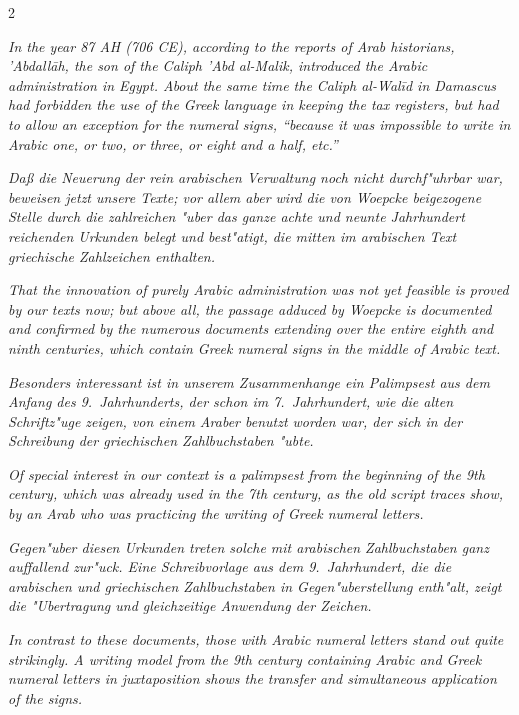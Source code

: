 \documentclass[10pt,a4paper]{article}
\newcommand{\enquote}[1]{``#1''}
\begin{document}
\begin{paracol}{2}
\switchcolumn

\textit{In the year 87 AH (706 CE), according to the reports of Arab historians, 'Abdall\=ah, the son of the Caliph 'Abd al-Malik, introduced the Arabic administration in Egypt. About the same time the Caliph al-Wal\={i}d in Damascus had forbidden the use of the Greek language in keeping the tax registers, but had to allow an exception for the numeral signs, \enquote{because it was impossible to write in Arabic one, or two, or three, or eight and a half, etc.}}

\switchcolumn*

\textit{Da\ss{} die Neuerung der rein arabischen Verwaltung noch nicht durchf"uhrbar war, beweisen jetzt unsere Texte; vor allem aber wird die von Woepcke beigezogene Stelle durch die zahlreichen "uber das ganze achte und neunte Jahrhundert reichenden Urkunden belegt und best"atigt, die mitten im arabischen Text griechische Zahlzeichen enthalten.}

\switchcolumn

\textit{That the innovation of purely Arabic administration was not yet feasible is proved by our texts now; but above all, the passage adduced by Woepcke is documented and confirmed by the numerous documents extending over the entire eighth and ninth centuries, which contain Greek numeral signs in the middle of Arabic text.}

\switchcolumn*

\textit{Besonders interessant ist in unserem Zusammenhange ein Palimpsest aus dem Anfang des 9.\ Jahrhunderts, der schon im 7.\ Jahrhundert, wie die alten Schriftz"uge zeigen, von einem Araber benutzt worden war, der sich in der Schreibung der griechischen Zahlbuchstaben "ubte.}

\switchcolumn

\textit{Of special interest in our context is a palimpsest from the beginning of the 9th century, which was already used in the 7th century, as the old script traces show, by an Arab who was practicing the writing of Greek numeral letters.}

\switchcolumn*

\textit{Gegen"uber diesen Urkunden treten solche mit arabischen Zahlbuchstaben ganz auffallend zur"uck. Eine Schreibvorlage aus dem 9.\ Jahrhundert, die die arabischen und griechischen Zahlbuchstaben in Gegen"uberstellung enth"alt, zeigt die "Ubertragung und gleichzeitige Anwendung der Zeichen.}

\switchcolumn

\textit{In contrast to these documents, those with Arabic numeral letters stand out quite strikingly. A writing model from the 9th century containing Arabic and Greek numeral letters in juxtaposition shows the transfer and simultaneous application of the signs.}


\end{paracol}
\end{document}
